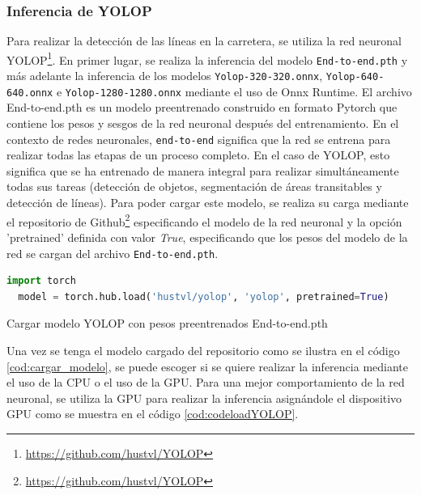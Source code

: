 \subsubsection{Inferencia de YOLOP}
\label{sec:Inferencia de YOLOP}

Para realizar la detección de las líneas en la carretera, se utiliza la red neuronal YOLOP\footnote{\url{https://github.com/hustvl/YOLOP}}. En primer lugar, 
se realiza la inferencia del modelo \texttt{End-to-end.pth} y más adelante la inferencia de los modelos \texttt{Yolop-320-320.onnx}, \texttt{Yolop-640-640.onnx} e 
\texttt{Yolop-1280-1280.onnx} mediante el uso de Onnx Runtime. 
El archivo End-to-end.pth es un modelo preentrenado construido en formato Pytorch que contiene los pesos y sesgos de la red neuronal después del entrenamiento. En el contexto de 
redes neuronales, \texttt{end-to-end} significa que la red se entrena para realizar todas las etapas de un proceso completo. En el caso de YOLOP, esto significa que se ha entrenado de manera integral 
para realizar simultáneamente todas sus tareas (detección de objetos, segmentación de áreas transitables y detección de líneas). Para poder cargar este modelo, se realiza 
su carga mediante el repositorio de Github\footnote{\url{https://github.com/hustvl/YOLOP}}
especificando el modelo de la red neuronal y la opción 'pretrained' definida con valor \textit{True}, especificando que los pesos del modelo de la red se cargan del archivo 
\texttt{End-to-end.pth}.\newline

\begin{code}[h]
  \begin{lstlisting}[language=Python]
  import torch
  model = torch.hub.load('hustvl/yolop', 'yolop', pretrained=True)

  \end{lstlisting}
  \caption[Cargar modelo YOLOP con pesos preentrenados End-to-end.pth]{Cargar modelo YOLOP con pesos preentrenados End-to-end.pth}
  \label{cod:cargar_modelo}
  \end{code}  

Una vez se tenga el modelo cargado del repositorio como se ilustra en el código \ref{cod:cargar_modelo}, se puede escoger 
si se quiere realizar la inferencia mediante el uso de la CPU o el uso de la GPU. Para una mejor comportamiento de la red neuronal, se utiliza
la GPU para realizar la inferencia asignándole el dispositivo GPU como se muestra en el código \ref{cod:codeloadYOLOP}.\newline

